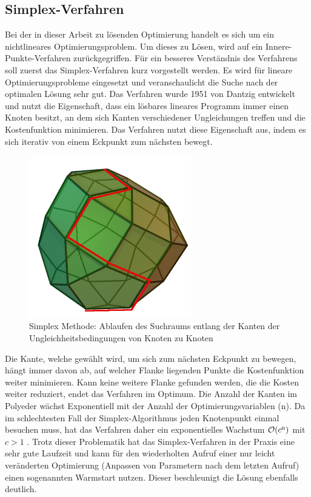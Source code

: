 \documentclass{like}
\begin{document}
\subsection{Simplex-Verfahren}
Bei der in dieser Arbeit zu lösenden Optimierung handelt es sich um ein nichtlineares Optimierungsproblem. Um dieses zu Lösen, wird auf ein Innere-Punkte-Verfahren zurückgegriffen. Für ein besseres Verständnis des Verfahrens soll zuerst das Simplex-Verfahren kurz vorgestellt werden. Es wird für lineare Optimierungsprobleme eingesetzt und veranschaulicht die Suche nach der optimalen Lösung sehr gut. Das Verfahren wurde 1951 von Dantzig \cite{dantzig51} entwickelt und nutzt die Eigenschaft, dass ein lösbares lineares Programm immer einen Knoten besitzt, an dem sich Kanten verschiedener Ungleichungen treffen und die Kostenfunktion minimieren. Das Verfahren nutzt diese Eigenschaft aus, indem es sich iterativ von einem Eckpunkt zum nächsten bewegt. 
\begin{figure}[ht!]
	\centering
	\includegraphics[width=200pt]{Abbildungen/simplexMethod.png}
	\caption{Simplex Methode: Ablaufen des Suchraums entlang der Kanten der Ungleichheitsbedingungen von Knoten zu Knoten}
	\label{fig:splxMethod}
\end{figure}

Die Kante, welche gewählt wird, um sich zum nächsten Eckpunkt zu bewegen, hängt immer davon ab, auf welcher Flanke liegenden Punkte die Kostenfunktion weiter minimieren. Kann keine weitere Flanke gefunden werden, die die Kosten weiter reduziert, endet das Verfahren im Optimum. Die Anzahl der Kanten im Polyeder wächst Exponentiell mit der Anzahl der Optimierungsvariablen (n). Da im schlechtesten Fall der Simplex-Algorithmus jeden Knotenpunkt einmal besuchen muss, hat das Verfahren daher ein exponentielles Wachstum $\mathcal{O}(c\textsuperscript{n})$ mit $c>1$ \cite{doi:10.1137/S0036144502414942}. Trotz dieser Problematik hat das Simplex-Verfahren in der Praxis eine sehr gute Laufzeit und kann für den wiederholten Aufruf einer nur leicht veränderten Optimierung (Anpassen von Parametern nach dem letzten Aufruf) einen sogenannten Warmstart nutzen. Dieser beschleunigt die Lösung ebenfalls deutlich.\\
\end{document}
